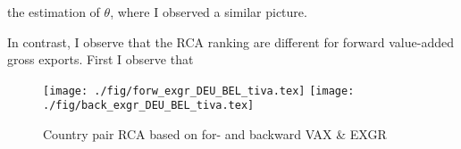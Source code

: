  the estimation of $\theta$, where I observed a similar picture. \par In contrast, I observe that the RCA ranking are different for forward value-added gross exports. First I observe that 
 \begin{figure}
\caption{Country pair RCA based on for- and backward  VAX \& EXGR }
\texttt{[image: ./fig/forw\_exgr\_DEU\_BEL\_tiva.tex]}
\texttt{[image: ./fig/back\_exgr\_DEU\_BEL\_tiva.tex]}
\end{figure}

\endinput